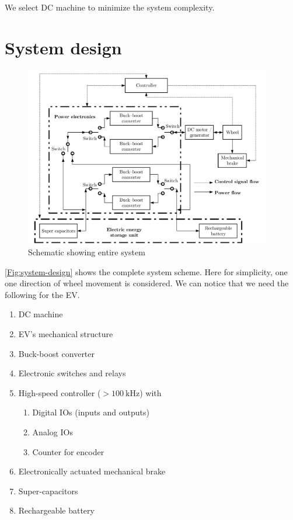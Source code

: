 \documentclass[journal]{IEEEtran}
\begin{document}
We select DC machine to minimize the system complexity.

\section{System design}
\begin{figure}
	\centering
	\includegraphics[width=0.96\textwidth]{system-design-v000}
	\caption{Schematic showing entire system}
	\label{Fig:system-design}
\end{figure}
\autoref{Fig:system-design} shows the complete system scheme. Here for simplicity, one one direction of wheel movement is considered. We can notice that we need the following for the EV.
\begin{tcolorbox}[colback=green!0!white,colframe=green!75!black,title=Requirements]
\begin{enumerate}
  \item DC machine
  \item EV's mechanical structure
  \item Buck-boost converter
  \item Electronic switches and relays
  \item High-speed controller ($>\SI{100}{\kilo\hertz}$) with
\begin{enumerate}
  \item Digital IOs (inputs and outputs)
  \item Analog IOs
  \item Counter for encoder
\end{enumerate}
  \item Electronically actuated mechanical brake
  \item Super-capacitors
  \item Rechargeable battery
\end{enumerate}
\end{tcolorbox}
\end{document}
